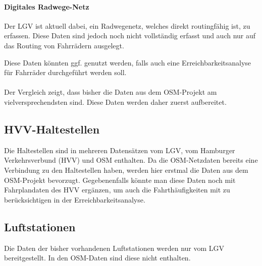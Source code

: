 \documentclass[a4paper,11pt,bibliography=totoc, listof=totoc,titlepage]{scrartcl}
\begin{document}
\paragraph{Digitales Radwege-Netz} Der LGV ist aktuell dabei, ein Radwegenetz, welches direkt routingfähig ist, zu erfassen. Diese Daten sind jedoch noch nicht vollständig erfasst und auch nur auf das Routing von Fahrrädern ausgelegt.  \citep{radwegenetz}

Diese Daten könnten ggf. genutzt werden, falls auch eine Erreichbarkeitsanalyse für Fahr\-räder durchgeführt werden soll.
\\
\\
Der Vergleich zeigt, dass bisher die Daten aus dem OSM-Projekt am vielversprechendsten sind. Diese Daten werden daher zuerst aufbereitet.

\subsection{HVV-Haltestellen}
Die Haltestellen sind in mehreren Datensätzen vom LGV, vom Hamburger Verkehrsverbund (HVV) und OSM enthalten. Da die OSM-Netzdaten bereits eine Verbindung zu den Haltestellen haben, werden hier erstmal die Daten aus dem OSM-Projekt bevorzugt. Gegebenenfalls könnte man diese Daten noch mit Fahrplandaten des HVV ergänzen, um auch die Fahrthäufigkeiten mit zu berücksichtigen in der Erreichbarkeitsanalyse.

\subsection{Luftstationen}
Die Daten der bisher vorhandenen Luftstationen werden nur vom LGV bereitgestellt. In den OSM-Daten sind diese nicht enthalten.

\clearpage
\renewcommand\UrlFont\itshape

\listoffigures
\end{document}
